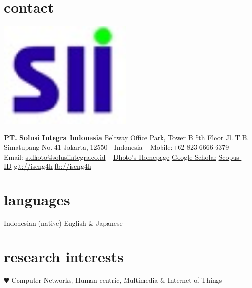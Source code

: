 \documentclass[style=verbose,maxnames=99,sorting=ydnt,style=verbose,maxnames=99,sorting=ydnt,backend=biber]{friggeri-cv} %
\begin{document}


\begin{aside} %
\section{contact}
\begin{center}
  \includegraphics[width=0.5\textwidth]{SII.jpeg}
  \end{center}
\textbf{PT. Solusi Integra Indonesia}
Beltway Office Park, Tower B 5th Floor
Jl. T.B. Simatupang No. 41
Jakarta, 12550 - Indonesia
~
Mobile:+62 823 6666 6379
Email: \href{mailto:s.dhoto@solusiintegra.co.id}{s.dhoto@solusiintegra.co.id}
~
\href{http://dhoto.lecturer.pens.ac.id/}{Dhoto's Homepage}
\href{https://scholar.google.co.id/citations?user=M6sGfNQAAAAJ&hl=en&oi=ao}{Google Scholar}
\href{https://www.scopus.com/authid/detail.uri?authorId=35100882700}{Scopus-ID}
\href{http://github.com/iseng4h}{git://iseng4h}
\href{http://facebook.com/iseng4h}{fb://iseng4h}
\section{languages}
Indonesian (native)
English \& Japanese 
\section{research interests}
{\color{red} $\varheartsuit$} Computer Networks,
Human-centric, Multimedia \& Internet of Things
\end{aside}

\end{document}
